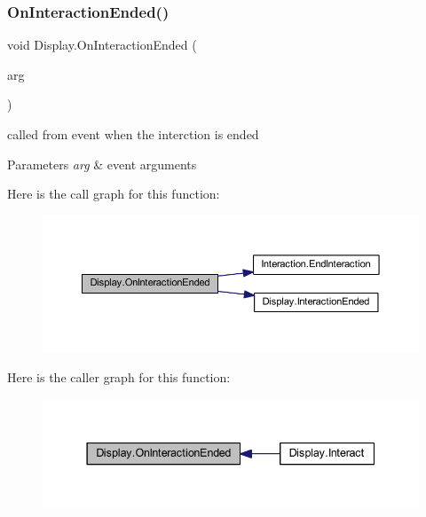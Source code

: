 \subsubsection{\texorpdfstring{On\+Interaction\+Ended()}{OnInteractionEnded()}}
{\footnotesize\ttfamily void Display.\+On\+Interaction\+Ended (\begin{DoxyParamCaption}\item[{\mbox{\hyperlink{class_player_interaction_event_args}{Player\+Interaction\+Event\+Args}}}]{arg }\end{DoxyParamCaption})}



called from event when the interction is ended 


\begin{DoxyParams}{Parameters}
{\em arg} & event arguments\\
\hline
\end{DoxyParams}
Here is the call graph for this function\+:
\nopagebreak
\begin{figure}[H]
\begin{center}
\leavevmode
\includegraphics[width=350pt]{class_display_a29f45efdf15e97219d2c8a614d699da8_cgraph}
\end{center}
\end{figure}
Here is the caller graph for this function\+:
\nopagebreak
\begin{figure}[H]
\begin{center}
\leavevmode
\includegraphics[width=337pt]{class_display_a29f45efdf15e97219d2c8a614d699da8_icgraph}
\end{center}
\end{figure}
\mbox{\label{class_display_af8aa8a663725645f431095397ad802e6}} 
